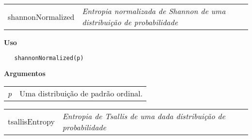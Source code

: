 \newpage

\hrulefill   

\begin{table}[!ht]
\begin{center}
\begin{tabularx}{\textwidth}{ X X}
\hspace{0.5cm} shannonNormalized & \textit{Entropia normalizada de Shannon de uma distribuição de probabilidade}\\
\end{tabularx}
\end{center}
\end{table} 

\vspace{-0.5cm}

\hrulefill  

\vspace{0.5cm}

\textbf{Uso}

\begin{lstlisting}
   shannonNormalized(p)
\end{lstlisting}

\vspace{0.5cm}

\textbf{Argumentos}

\begin{table}[!ht]
\begin{center}
\begin{tabularx}{\textwidth}{X X}
\hspace{0.5cm} \textit{p} & Uma distribuição de padrão ordinal.\\
\end{tabularx}
\end{center}
\end{table} 

\hrulefill   

\begin{table}[!ht]
\begin{center}
\begin{tabularx}{\textwidth}{ X X}
\hspace{0.5cm} tsallisEntropy & \textit{Entropia de Tsallis de uma dada distribuição de probabilidade}\\
\end{tabularx}
\end{center}
\end{table} 

